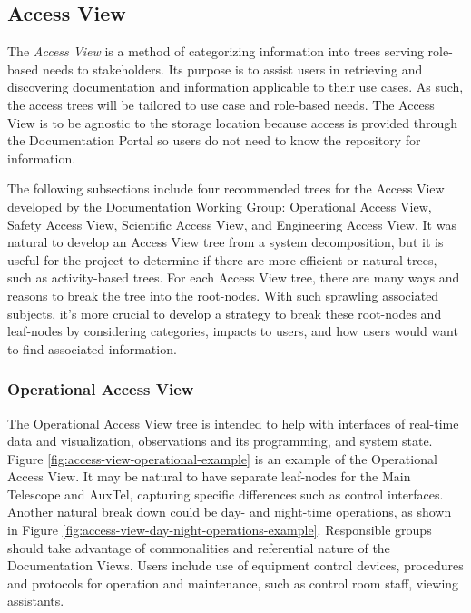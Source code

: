 \subsection{Access View}
\label{sec:access-view}

The \emph{Access View} is a method of categorizing information into trees serving role-based needs to stakeholders.
Its purpose is to assist users in retrieving and discovering documentation and information applicable to their use cases.
As such, the access trees will be tailored to use case and role-based needs.
The Access View is to be agnostic to the storage location because access is provided through the Documentation Portal so users do not need to know the repository for information.

The following subsections include four recommended trees for the Access View developed by the Documentation Working Group: Operational Access View, Safety Access View, Scientific Access View, and Engineering Access View.
It was natural to develop an Access View tree from a system decomposition, but it is useful for the project to determine if there are more efficient or natural trees, such as activity-based trees.
For each Access View tree, there are many ways and reasons to break the tree into the root-nodes.
With such sprawling associated subjects, it's more crucial to develop a strategy to break these root-nodes and leaf-nodes by considering categories, impacts to users, and how users would want to find associated information.

\subsubsection{Operational Access View}

The Operational Access View tree is intended to help with interfaces of real-time data and visualization, observations and its programming, and system state.
Figure \ref{fig:access-view-operational-example} is an example of the Operational Access View.
It may be natural to have separate leaf-nodes for the Main Telescope and AuxTel, capturing specific differences such as control interfaces.
Another natural break down could be day- and night-time operations, as shown in Figure \ref{fig:access-view-day-night-operations-example}.
Responsible groups should take advantage of commonalities and referential nature of the Documentation Views.
Users include use of equipment control devices, procedures and protocols for operation and maintenance, such as control room staff, viewing assistants.

